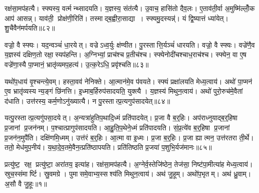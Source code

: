 रक्ष॑सा॒मप॑हत्यै। स्फ्यस्य॒ वर्त्मन्थ्सादयति। य॒ज्ञस्य॒ संत॑त्यै। उ॒वाच॒ हासि॑तो दैव॒लः। ए॒ताव॑ती॒र्वा अ॒मुष्मि॑ल्लोँ॒क आप॑ आसन्न्। याव॑ती॒ प्रोक्ष॑णी॒रिति॑। तस्माद्ब॒ह्वीरा॒साद्या। स्फ्यमु॒दस्यन्न्॑। यं द्वि॒ष्यात्तं ध्या॑येत्। शु॒चैवैन॑मर्पयति॥८२॥

वज्रो॒ वै स्फ्यः। यद॒न्वञ्चं॑ धा॒रयेत्। वज्रेऽध्व॒र्युः क्ष॑ण्वीत। पु॒रस्तात्ति॒र्यञ्चं॑ धारयति। वज्रो॒ वै स्फ्यः। वज्रे॑णै॒व य॒ज्ञस्य॑ दक्षिण॒तो रक्षा॒स्यप॑हन्ति। अ॒ग्निभ्यां॒ प्राच॑श्च प्र॒तीच॑श्च। स्फ्येनोदी॑चश्चाध॒राच॑श्च। स्फ्येन॒ वा ए॒ष वज्रे॑णा॒स्यै पा॒प्मानं॒ भ्रातृ॑व्यमप॒हत्य॑। उ॒त्क॒रेऽधि॒ प्रवृ॑श्चति॥८३॥

यथो॑प॒धाय॑ वृ॒श्चन्त्ये॒वम्। हस्ता॒वव॑ नेनिक्ते। आ॒त्मान॑मे॒व प॑वयते। स्फ्यं प्रक्षा॑लयति मेध्य॒त्वाय॑। अथो॑ पा॒प्मन॑ ए॒व भ्रातृ॑व्यस्य न्य॒ङ्गं छि॑नत्ति। इ॒ध्माब॒र्\mbox{}हिरुप॑सादयति॒ युक्त्यै। य॒ज्ञस्य॑ मिथुन॒त्वाय॑। अथो॑ पुरो॒रुच॑मे॒वैतां द॑धाति। उत्त॑रस्य॒ कर्म॒णोऽनु॑ख्यात्यै। न पु॒रस्तात्प्र॒त्यगुप॑सादयेत्॥८४॥

यत्पु॒रस्तात्प्र॒त्यगु॑पसा॒दयेत्। अ॒न्यत्रा॑हुतिप॒थादि॒ध्मं प्रति॑पादयेत्। प्र॒जा वै ब॒र्॒हिः। अप॑राध्नुयाद्ब॒र्॒हिषा प्र॒जानां प्र॒जन॑नम्। प॒श्चात्प्रागुप॑सादयति। आ॒हु॒ति॒प॒थेने॒ध्मं प्रति॑पादयति। सं॒प्र॒त्ये॑व ब॒र्॒हिषा प्र॒जानां प्र॒जन॑न॒मुपै॑ति। दक्षि॑णमि॒ध्मम्। उत्त॑रं ब॒र्॒हिः। आ॒त्मा वा इ॒ध्मः। प्र॒जा ब॒र्॒हिः। प्र॒जा ह्यात्मन॒ उत्त॑रतरा ती॒र्थे। ततो॒ मेध॑मुप॒नीय॑। य॒था॒दे॒व॒तमे॒वैन॒त्प्रति॑ष्ठापयति। प्रति॑तिष्ठति प्र॒जया॑ प॒शुभि॒र्यज॑मानः॥८५॥



\clearpage
{}
\setcounter{anuvakam}{0}
प्रत्यु॑ष्ट॒ रक्ष॒ प्रत्यु॑ष्टा॒ अरा॑तय॒ इत्या॑ह। रक्ष॑सा॒मप॑हत्यै। अ॒ग्नेर्व॒स्तेजि॑ष्ठेन॒ तेज॑सा॒ निष्ट॑पा॒मीत्या॑ह मेध्य॒त्वाय॑। स्रुच॒स्संमार्ष्टि। स्रु॒वमग्रे। पुमासमे॒वाभ्य॒स्सश्य॑ति मिथुन॒त्वाय॑। अथ॑ जु॒हूम्। अथो॑प॒भृतम्। अथ॑ ध्रु॒वाम्। अ॒सौ वै जु॒हूः॥१॥

